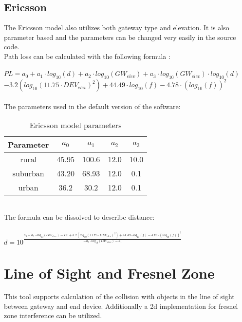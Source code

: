 \documentclass[12pt,a4paper]{article}
\begin{document}
\subsection{Ericsson}
The Ericsson model also utilizes both gateway type and elevation. It is also parameter based and the parameters can be changed very easily in the source code.\\
Path loss can be calculated with the following formula \cite{ericsson_cost231}:\\
\\
$PL=a_0+a_1 \cdot log_{10}(d)+a_2 \cdot log_{10}(GW_{elev})+a_3\cdot log_{10}(GW_{elev})\cdot log_{10}(d)$\\
$-3.2(log_{10}(11.75\cdot DEV_{elev})^2)+44.49\cdot log_{10}(f)-4.78\cdot(log_{10}(f))^2$\\
\\
The parameters used in the default version of the software:\\
\begin{table}[!th]
	\centering
	\caption{Ericsson model parameters}
\begin{tabular}{|c|c|c|c|c|}
	\hline
	Parameter&$a_0$&$a_1$&$a_2$&$a_3$\\ \hline
	rural&45.95&100.6&12.0&10.0\\ \hline
	suburban&43.20&68.93&12.0&0.1\\ \hline
	urban&36.2&30.2&12.0&0.1\\ \hline
\end{tabular}
\end{table}
\\
The formula can be dissolved to describe distance:\\
\\
$d=10^{\frac{a_0+a_2\cdot log_{10}(GW_{elev})-PL+3.2(log_{10}(11.75\cdot DEV_{elev})^2)+44.49\cdot log_{10}(f)-4.78\cdot(log_{10}(f))^2}{-a_3\cdot log_{10}(GW_{elev})-a_1}}$
\section{Line of Sight and Fresnel Zone}
This tool supports calculation of the collision with objects in the line of sight between gateway and end device. Additionally a 2d implementation for fresnel zone interference can be utilized.
\end{document}
